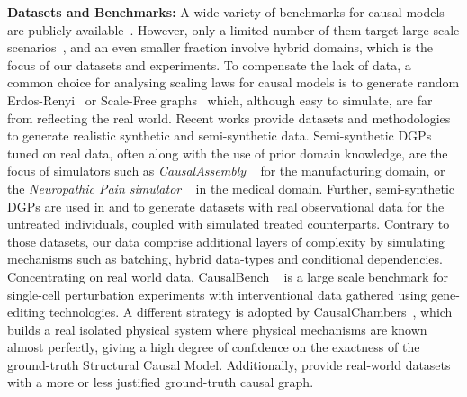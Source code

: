 \textbf{Datasets and Benchmarks:}
A wide variety of benchmarks for causal models are publicly available~\citep{asiadataset, alarmdataset, sachsdataset}.
However, only a limited number of them target large scale scenarios~\cite{diabetesdataset}, and an even smaller fraction involve hybrid domains, which is the focus of our datasets and experiments.
To compensate the lack of data, a common choice for analysing scaling laws for causal models is to generate random Erdos-Renyi~\citep{Erdos1984OnTE} or Scale-Free graphs~\citep{barabasi1999emergence} which, although easy to simulate, are far from reflecting the real world. 
Recent works provide datasets and methodologies to generate realistic synthetic and semi-synthetic data. 
Semi-synthetic DGPs tuned on real data, often along with the use of prior domain knowledge, are the focus of simulators such as \textit{CausalAssembly} ~\citep{göbler2024causalassembly} for the manufacturing domain, or the \textit{Neuropathic Pain simulator} ~\citep{DBLP:conf/nips/Tu0BK019} in the medical domain. Further, semi-synthetic DGPs are used in \cite{Dorie2017AutomatedVD,Hahn2019AtlanticCI} and \cite{Shimoni2018BenchmarkingFF} to generate datasets with real observational data for the untreated individuals, coupled with simulated treated counterparts.
Contrary to those datasets, our data comprise additional layers of complexity by simulating mechanisms such as batching, hybrid data-types and conditional dependencies.
Concentrating on real world data, CausalBench ~\citep{Chevalley2022CausalBenchAL} is a large scale benchmark for single-cell perturbation experiments with interventional data gathered using gene-editing technologies. 
A different strategy is adopted by CausalChambers~\citep{gamella2024causalchambers}, which builds a real isolated physical system where physical mechanisms are known almost perfectly, giving a high degree of confidence on the exactness of the ground-truth Structural Causal Model. Additionally, \cite{pmlr-v236-mogensen24a, mhalla2020causalmechanismextremeriver} provide real-world datasets with a more or less justified ground-truth causal graph.